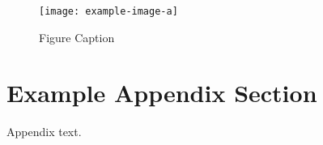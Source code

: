 \documentclass[authoryear,preprint,review,12pt]{elsarticle}
\begin{document}
\begin{figure}[t]%
\centering%
\texttt{[image: example-image-a]}
\caption{Figure Caption}\label{fig1}
\end{figure}


\appendix
\section{Example Appendix Section}
\label{app1}

Appendix text.












\end{document}
